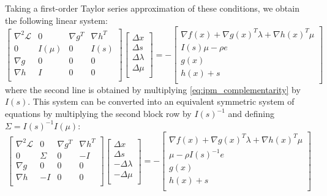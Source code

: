 \documentclass[../root.tex]{subfiles}
\begin{document}
    Taking a first-order Taylor series approximation of these conditions, we
    obtain the following linear system:
    \begin{equation}
        \begin{bmatrix}
            \nabla^2 \mathcal{L} & 0 & \nabla g^T & \nabla h^T \\
            0 & I(\mu) & 0 & I(s) \\
            \nabla g & 0 & 0 & 0 \\
            \nabla h & I & 0 & 0 \\
        \end{bmatrix}
        \begin{bmatrix}
            \Delta x \\
            \Delta s \\
            \Delta \lambda \\
            \Delta \mu\\
        \end{bmatrix} = -
        \begin{bmatrix}
            \nabla f(x) + \nabla g(x)^T \lambda + \nabla h(x)^T \mu \\
            I(s) \mu - \rho e \\
            g(x) \\
            h(x) + s \\
        \end{bmatrix}
    \end{equation}
    where the second line is obtained by multiplying \eqref{eq:ipm_complementarity} by $I(s)$.
    This system can be converted into an equivalent symmetric system of equations by multiplying
    the second block row by $I(s)^{-1}$ and defining $\Sigma = I(s)^{-1} I(\mu)$:
    \begin{equation}
        \begin{bmatrix}
            \nabla^2 \mathcal{L} & 0 & \nabla g^T & \nabla h^T \\
            0 & \Sigma & 0 & -I \\
            \nabla g & 0 & 0 & 0 \\
            \nabla h & -I & 0 & 0 \\
        \end{bmatrix} 
        \begin{bmatrix}
            \Delta x \\
            \Delta s \\
            -\Delta \lambda \\
            -\Delta \mu\\
        \end{bmatrix} = -
        \begin{bmatrix}
            \nabla f(x) + \nabla g(x)^T \lambda + \nabla h(x)^T \mu \\
            \mu - \rho I(s)^{-1} e \\
            g(x) \\
            h(x) + s \\
        \end{bmatrix}
    \end{equation}
\end{document}
